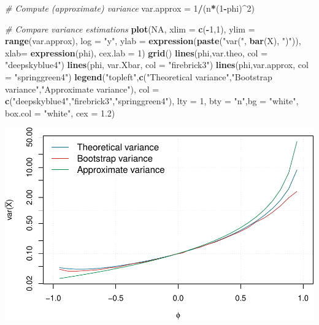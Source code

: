 \documentclass[]{book}
\newenvironment{Shaded}{\begin{snugshade}}{\end{snugshade}}
\newcommand{\CommentTok}[1]{\textcolor[rgb]{0.56,0.35,0.01}{\textit{#1}}}
\newcommand{\DataTypeTok}[1]{\textcolor[rgb]{0.13,0.29,0.53}{#1}}
\newcommand{\DecValTok}[1]{\textcolor[rgb]{0.00,0.00,0.81}{#1}}
\newcommand{\FloatTok}[1]{\textcolor[rgb]{0.00,0.00,0.81}{#1}}
\newcommand{\KeywordTok}[1]{\textcolor[rgb]{0.13,0.29,0.53}{\textbf{#1}}}
\newcommand{\NormalTok}[1]{#1}
\newcommand{\OperatorTok}[1]{\textcolor[rgb]{0.81,0.36,0.00}{\textbf{#1}}}
\newcommand{\OtherTok}[1]{\textcolor[rgb]{0.56,0.35,0.01}{#1}}
\newcommand{\StringTok}[1]{\textcolor[rgb]{0.31,0.60,0.02}{#1}}
\theoremstyle{definition}
\theoremstyle{definition}
\theoremstyle{definition}
\theoremstyle{remark}
\begin{document}
\begin{Shaded}
\begin{Highlighting}[]
\CommentTok{# Compute (approximate) variance}
\NormalTok{var.approx =}\StringTok{ }\DecValTok{1}\OperatorTok{/}\NormalTok{(n}\OperatorTok{*}\NormalTok{(}\DecValTok{1}\OperatorTok{-}\NormalTok{phi)}\OperatorTok{^}\DecValTok{2}\NormalTok{)}

\CommentTok{# Compare variance estimations}
\KeywordTok{plot}\NormalTok{(}\OtherTok{NA}\NormalTok{, }\DataTypeTok{xlim =} \KeywordTok{c}\NormalTok{(}\OperatorTok{-}\DecValTok{1}\NormalTok{,}\DecValTok{1}\NormalTok{), }\DataTypeTok{ylim =} \KeywordTok{range}\NormalTok{(var.approx), }\DataTypeTok{log =} \StringTok{"y"}\NormalTok{, }
     \DataTypeTok{ylab =} \KeywordTok{expression}\NormalTok{(}\KeywordTok{paste}\NormalTok{(}\StringTok{"var("}\NormalTok{, }\KeywordTok{bar}\NormalTok{(X), }\StringTok{")"}\NormalTok{)),}
     \DataTypeTok{xlab=} \KeywordTok{expression}\NormalTok{(phi), }\DataTypeTok{cex.lab =} \DecValTok{1}\NormalTok{)}
\KeywordTok{grid}\NormalTok{()}
\KeywordTok{lines}\NormalTok{(phi,var.theo, }\DataTypeTok{col =} \StringTok{"deepskyblue4"}\NormalTok{)}
\KeywordTok{lines}\NormalTok{(phi, var.Xbar, }\DataTypeTok{col =} \StringTok{"firebrick3"}\NormalTok{)}
\KeywordTok{lines}\NormalTok{(phi,var.approx, }\DataTypeTok{col =} \StringTok{"springgreen4"}\NormalTok{)}
\KeywordTok{legend}\NormalTok{(}\StringTok{"topleft"}\NormalTok{,}\KeywordTok{c}\NormalTok{(}\StringTok{"Theoretical variance"}\NormalTok{,}\StringTok{"Bootstrap variance"}\NormalTok{,}\StringTok{"Approximate variance"}\NormalTok{), }
       \DataTypeTok{col =} \KeywordTok{c}\NormalTok{(}\StringTok{"deepskyblue4"}\NormalTok{,}\StringTok{"firebrick3"}\NormalTok{,}\StringTok{"springgreen4"}\NormalTok{), }\DataTypeTok{lty =} \DecValTok{1}\NormalTok{,}
       \DataTypeTok{bty =} \StringTok{"n"}\NormalTok{,}\DataTypeTok{bg =} \StringTok{"white"}\NormalTok{, }\DataTypeTok{box.col =} \StringTok{"white"}\NormalTok{, }\DataTypeTok{cex =} \FloatTok{1.2}\NormalTok{)}
\end{Highlighting}
\end{Shaded}

\includegraphics{ts_files/figure-latex/estimXbar-1.pdf}
\end{document}
